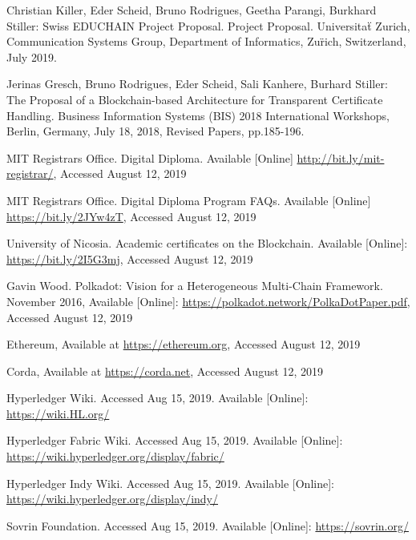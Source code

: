 \begin{thebibliography}{99}


 Christian Killer, Eder Scheid, Bruno Rodrigues, Geetha Parangi, Burkhard Stiller: Swiss EDUCHAIN
Project Proposal. Project Proposal. Universita\"t Zurich, Communication Systems Group, Department of Informatics, Zu\"rich, Switzerland, July 2019.

 Jerinas Gresch, Bruno Rodrigues, Eder Scheid, Sali Kanhere, Burhard Stiller: The Proposal of
a Blockchain-based Architecture for Transparent Certificate Handling. Business Information Systems
(BIS) 2018 International Workshops, Berlin, Germany, July 18, 2018, Revised Papers,
pp.185-196.

 MIT Registrars Office. Digital Diploma. Available [Online] \url{http://bit.ly/mit-registrar/}, Accessed
August 12, 2019


 MIT Registrars Office. Digital Diploma Program FAQs. Available [Online] \url{https://bit.ly/2JYw4zT},
Accessed August 12, 2019


 University of Nicosia. Academic certificates on the Blockchain. Available [Online]: \url{https://bit.ly/2I5G3mj}, Accessed August 12, 2019

 Gavin Wood. Polkadot: Vision for a Heterogeneous Multi-Chain Framework. November 2016,
Available [Online]: \url{https://polkadot.network/PolkaDotPaper.pdf}, Accessed August 12, 2019

 Ethereum, Available at \url{https://ethereum.org}, Accessed August 12, 2019

 Corda, Available at \url{https://corda.net}, Accessed August 12, 2019

 Hyperledger Wiki. Accessed Aug 15, 2019. Available [Online]: \url{https://wiki.HL.org/}

 Hyperledger Fabric Wiki. Accessed Aug 15, 2019. Available [Online]: \url{https://wiki.hyperledger.org/display/fabric/}

 Hyperledger Indy Wiki. Accessed Aug 15, 2019. Available [Online]: \url{https://wiki.hyperledger.org/display/indy/}

 Sovrin Foundation. Accessed Aug 15, 2019. Available [Online]: \url{https://sovrin.org/}


\end{thebibliography}

